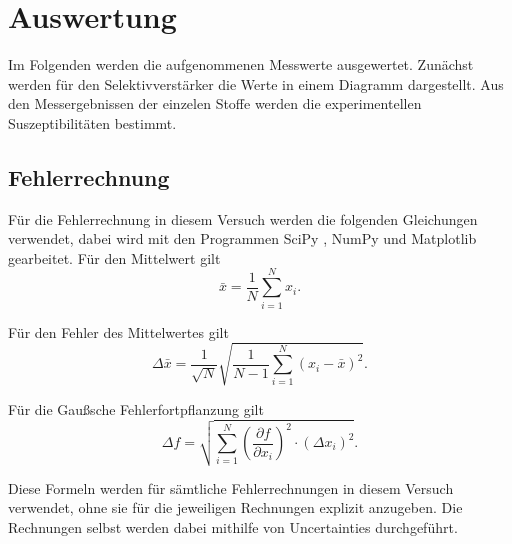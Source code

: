 \section{Auswertung}
\label{sec:auswertung}
 Im Folgenden werden die aufgenommenen Messwerte ausgewertet. Zunächst werden für den Selektivverstärker 
 die Werte in einem Diagramm dargestellt. Aus den Messergebnissen der einzelen Stoffe werden die 
 experimentellen Suszeptibilitäten bestimmt.

\subsection{Fehlerrechnung}
\label{sec:Fehlerrechnung}
Für die Fehlerrechnung in diesem Versuch werden die folgenden Gleichungen verwendet, dabei wird mit den Programmen
SciPy \cite{scipy}, NumPy \cite{numpy} und Matplotlib \cite{matplotlib} gearbeitet.
    Für den Mittelwert gilt
    \begin{equation}
    \bar{x} = \frac{1}{N}\sum\limits_{i = 1}^N x_i .
    \end{equation}

    Für den Fehler des Mittelwertes gilt
    \begin{equation}
        \Delta \bar{x}=\frac{1}{\sqrt{N}} \sqrt{\frac{1}{N-1} \sum_{i=1}^N\left(x_i-\bar{x}\right)^2}.
        \label{eqn:mittelwert}
        \end{equation}

    Für die Gaußsche Fehlerfortpflanzung gilt
    \begin{equation}
        \Delta f=\sqrt{\sum_{i=1}^N\left(\frac{\partial f}{\partial x_i}\right)^2 \cdot\left(\Delta x_i\right)^2}.
    \end{equation}

    Diese Formeln werden für sämtliche Fehlerrechnungen in diesem Versuch verwendet, ohne sie für die 
    jeweiligen Rechnungen explizit anzugeben. Die Rechnungen selbst werden dabei mithilfe von
    Uncertainties \cite{uncertainties} durchgeführt.


